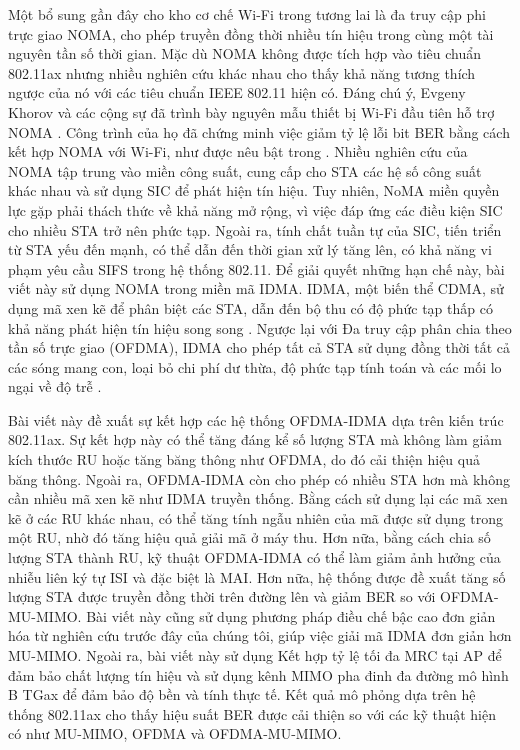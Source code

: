 Một bổ sung gần đây cho kho cơ chế Wi-Fi trong tương lai là đa truy cập phi trực giao \acrshort{NOMA}, cho phép truyền đồng thời nhiều tín hiệu trong cùng một tài nguyên tần số thời gian. Mặc dù NOMA không được tích hợp vào tiêu chuẩn 802.11ax nhưng nhiều nghiên cứu khác nhau cho thấy khả năng tương thích ngược của nó với các tiêu chuẩn IEEE 802.11 hiện có. Đáng chú ý, Evgeny Khorov và các cộng sự đã trình bày nguyên mẫu thiết bị Wi-Fi đầu tiên hỗ trợ NOMA \cite{NOMA_WiFi}. Công trình của họ đã chứng minh việc giảm tỷ lệ lỗi bit \acrshort{BER} bằng cách kết hợp NOMA với Wi-Fi, như được nêu bật trong \cite{PhaseNoise}.
Nhiều nghiên cứu của NOMA tập trung vào miền công suất, cung cấp cho STA các hệ số công suất khác nhau và sử dụng \acrfull{SIC} để phát hiện tín hiệu. Tuy nhiên, NoMA miền quyền lực gặp phải thách thức về khả năng mở rộng, vì việc đáp ứng các điều kiện \acrshort{SIC} cho nhiều STA trở nên phức tạp. 
Ngoài ra, tính chất tuần tự của SIC, tiến triển từ STA yếu đến mạnh, có thể dẫn đến thời gian xử lý tăng lên, có khả năng vi phạm yêu cầu \acrfull{SIFS} trong hệ thống 802.11. Để giải quyết những hạn chế này, bài viết này sử dụng NOMA trong miền mã \acrfull{IDMA}. IDMA, một biến thể \acrfull{CDMA}, sử dụng mã xen kẽ để phân biệt các STA, dẫn đến bộ thu có độ phức tạp thấp có khả năng phát hiện tín hiệu song song \cite{IDMA}. Ngược lại với Đa truy cập phân chia theo tần số trực giao (OFDMA), IDMA cho phép tất cả STA sử dụng đồng thời tất cả các sóng mang con, loại bỏ chi phí dư thừa, độ phức tạp tính toán và các mối lo ngại về độ trễ \cite{IDMA_Per}.

Bài viết này đề xuất sự kết hợp các hệ thống OFDMA-IDMA dựa trên kiến trúc 802.11ax.
Sự kết hợp này có thể tăng đáng kể số lượng STA mà không làm giảm kích thước RU hoặc tăng băng thông như OFDMA, do đó cải thiện hiệu quả băng thông.
Ngoài ra, OFDMA-IDMA còn cho phép có nhiều STA hơn mà không cần nhiều mã xen kẽ như IDMA truyền thống. Bằng cách sử dụng lại các mã xen kẽ ở các RU khác nhau, có thể tăng tính ngẫu nhiên của mã được sử dụng trong một RU, nhờ đó tăng hiệu quả giải mã ở máy thu.
Hơn nữa, bằng cách chia số lượng STA thành RU, kỹ thuật OFDMA-IDMA có thể làm giảm ảnh hưởng của nhiễu liên ký tự \acrfull{ISI} và đặc biệt là \acrshort{MAI}.
Hơn nữa, hệ thống được đề xuất tăng số lượng STA được truyền đồng thời trên đường lên và giảm BER so với OFDMA-MU-MIMO. Bài viết này cũng sử dụng phương pháp điều chế bậc cao đơn giản hóa \cite{IDMAHighOder} từ nghiên cứu trước đây của chúng tôi, giúp việc giải mã IDMA đơn giản hơn MU-MIMO.
Ngoài ra, bài viết này sử dụng Kết hợp tỷ lệ tối đa \acrshort{MRC} tại AP để đảm bảo chất lượng tín hiệu và sử dụng kênh \acrshort{MIMO} pha đinh đa đường mô hình B TGax \cite{TGax} để đảm bảo độ bền và tính thực tế. Kết quả mô phỏng dựa trên hệ thống 802.11ax cho thấy hiệu suất BER được cải thiện so với các kỹ thuật hiện có như MU-MIMO, OFDMA và OFDMA-MU-MIMO.

